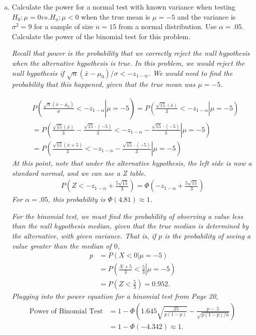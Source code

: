 \documentclass[12pt]{article}
\begin{document}
\begin{enumerate}[(a)]
\item Calculate the power for a normal test with known variance when testing $H_0: \mu = 0 vs. H_a: \mu < 0$ when the true mean is $\mu=-5$ and the variance is $\sigma^2 =9$ for a sample of size $n = 15$ from a normal distribution. Use $\alpha = .05$. Calculate the power of the binomial test for this problem.

\emph{Recall that power is the probability that we correctly reject the null hypothesis when the alternative hypothesis is true. In this problem, we would reject the null hypothesis if $\sqrt{n} (\bar{x} - \mu_0) / \sigma < -z_{1-\alpha}$. We would need to find the probability that this happened, given that the true mean was $\mu=-5$.}

\begin{align*}
&P \left. \left(\frac{\sqrt{n} (\bar{x} - \mu_0)}{\sigma} < -z_{1-\alpha} \right| \mu=-5 \right) 
= P\left. \left(\frac{\sqrt{15} (\bar{x})}{3} < -z_{1-\alpha} \right| \mu=-5 \right) \\
&= P \left. \left(\frac{\sqrt{15} (\bar{x})}{3} - \frac{\sqrt{15} \cdot (-5)}{3} < -z_{1-\alpha} - \frac{\sqrt{15} \cdot (-5)}{3} \right| \mu=-5 \right) \\
&= P \left. \left(\frac{\sqrt{15} (\bar{x} + 5)}{3} < -z_{1-\alpha} - \frac{\sqrt{15} \cdot (-5)}{3} \right| \mu=-5 \right)
\end{align*}
\emph{At this point, note that under the alternative hypothesis, the left side is now a standard normal, and we can use a Z table.}
\begin{align*}
P \left(Z < -z_{1-\alpha} + \frac{5 \sqrt{15}}{3} \right) = \Phi \left(-z_{1-\alpha} + \frac{5 \sqrt{15}}{3} \right)
\end{align*}
\emph{For $\alpha=.05$, this probability is $\Phi\left( 4.81 \right) \approx 1$.}

\emph{For the binomial test, we must find the probability of observing a value less than the null hypothesis median, given that the true median is determined by the alternative, with given variance. That is, if $p$ is the probability of seeing a value greater than the median of $0$,}
\begin{align*}
p &= P \left. \left( X < 0 \right| \mu=-5 \right) \\
& = P \left. \left( \frac{X+5}{3} < \frac{5}{3} \right| \mu=-5 \right) \\
& = P \left( Z < \frac{5}{3} \right) = 0.952.
\end{align*}
\emph{Plugging into the power equation for a binomial test from Page 20, }
\begin{align*}
\mbox{Power of Binomial Test} 
& = 1-\Phi \left( 1.645 \sqrt{\frac{.25}{p(1-p)}} - \frac{p-.5}{\sqrt{p(1-p)/n}} \right)\\
& = 1-\Phi \left( -4.342 \right) \approx 1.
\end{align*}


\end{enumerate}
\end{document}
